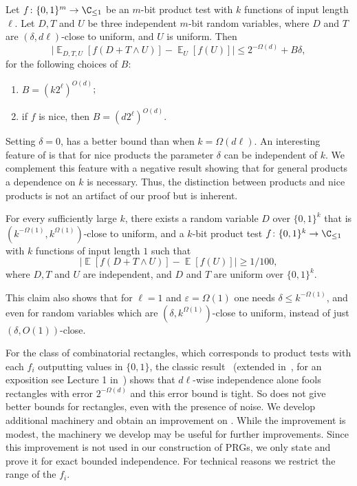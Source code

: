 \documentclass{toc}
\newcommand{\zo}{\{0,1\}}
\def\eps{\varepsilon}
\def\Blocklength{\ell}
\DeclareMathOperator*{\E}{\mathbb{E}}                 %
\begin{document}
\begin{theorem} \label{t-bipn-prod-intro}
  Let $f\colon \zo^m \to \C_{\le 1}$ be an %
  $m$-bit %
  product test with $k$ functions of
  input length $\Blocklength$. 
  Let $D,T$ and $U$ be three independent $m$-bit random variables, where  %
  $D$ and $T$ are $(\delta, d\Blocklength)$-close to uniform,
  and $U$ is uniform.
  Then
   \[
     \bigl| \E_{D,T,U} [ f(D+T \wedge U) ] - \E_U[f(U)] \bigr| \le 2^{-\Omega(d)} + B \delta ,
   \]
  for the following choices of $B$:
  \begin{enumerate}[label=\roman*.,ref=\ref{t-bipn-prod-intro}.\roman*]
    \item \label{thm:bipnfp-general}
      $B = (k2^\Blocklength)^{O(d)}$;
    \item \label{thm:bipnfp-nice}
      if $f$ is nice, then $B = (d 2^\Blocklength)^{O(d)}.$
  \end{enumerate}
\end{theorem}

Setting $\delta = 0$,  has a better bound than  when $k = \Omega(d\Blocklength)$.
An interesting feature of  is that for nice
products the parameter $\delta$ can be independent of $k$.  We
complement this feature with a negative result showing that for general
products a dependence on $k$ is necessary.
Thus, the distinction between products and nice products is not an artifact of our proof but is
inherent.

\begin{claim} \label{claim-counterexample}
For every sufficiently large $k$, there exists a random variable $D$ over
$\zo^k$ that is $(k^{-\Omega(1)}, k^{\Omega(1)})$-close to uniform, and a 
$k$-bit %
product test $f\colon \zo^{k} \to \C_{\le 1}$ with
$k$ functions of input length $1$ such that
  \[
    \big| \E[f(D + T \wedge U)] - \E[f(U)] \big| \ge 1/100 ,
  \]
  where $D,T$ and $U$ are independent, and $D$ and $T$ are uniform over $\zo^k$. %
%
\end{claim}

This claim also shows that for $\Blocklength = 1$ and $\eps = \Omega(1)$ one needs
$\delta \le k^{-\Omega(1)}$, and even for random variables which are $(\delta,
k^{\Omega(1)})$-close to uniform, instead of just $(\delta, O(1))$-close.

For the class of combinatorial rectangles, which corresponds to product tests with each $f_i$ outputting values in $\{0, 1\}$, 
the classic result~\cite{EvenGLNV98} (extended in~\cite{ChariRS00}, for an exposition see Lecture 1 in~\cite{viola-special-topics17}) 
shows that $d\Blocklength$-wise independence alone fools rectangles with error $2^{-\Omega(d)}$ and this error bound is tight.
So  does not give better bounds for rectangles, even with the presence of noise.
We develop additional machinery and obtain an improvement on .
While the improvement is modest, the machinery we develop may be useful for further improvements.
Since this improvement is not used in our construction of PRGs, we only state
and prove it for exact bounded independence.
For technical reasons we restrict the range of the $f_i$.
\end{document}
